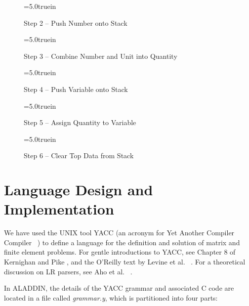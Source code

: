 \vspace{0.35 in}
\begin{figure}[h]
\epsfxsize=5.0truein
\centerline{}
\caption{Step 2 -- Push Number onto Stack}
\label{fig: example_stack_2}
\end{figure}

\clearpage
\begin{figure}[h]
\epsfxsize=5.0truein
\centerline{}
\caption{Step 3 -- Combine Number and Unit into Quantity}
\label{fig: example_stack_3}
\end{figure}

\vspace{0.35 in}
\begin{figure}[h]
\epsfxsize=5.0truein
\centerline{}
\caption{Step 4 -- Push Variable onto Stack}
\label{fig: example_stack_4}
\end{figure}

\clearpage
\begin{figure}[h]
\epsfxsize=5.0truein
\centerline{}
\caption{Step 5 -- Assign Quantity to Variable}
\label{fig: example_stack_5}
\end{figure}

\vspace{0.35 in}
\begin{figure}[h]
\epsfxsize=5.0truein
\centerline{}
\caption{Step 6 -- Clear Top Data from Stack}
\label{fig: example_stack_6}
\end{figure}

\clearpage
\section{Language Design and Implementation}

\vspace{0.15 in}
\noindent\hspace{0.5 in}
We have used the UNIX tool YACC (an acronym for Yet Another Compiler
Compiler ~\cite{johnson75}) to define a language for the
definition and solution of matrix and finite element problems.
For gentle introductions to YACC,
see Chapter 8 of Kernighan and Pike \cite{kernighan-pike},
and the O'Reilly text by Levine et al. ~\cite{levine92}.
For a theoretical discussion on LR parsers, see Aho et al. ~\cite{aho85}.

\vspace{0.15 in}
\noindent\hspace{0.5 in}
In ALADDIN, the details of the YACC grammar and associated C code
are located in a file called {\it grammar.y},
which is partitioned into four parts:


